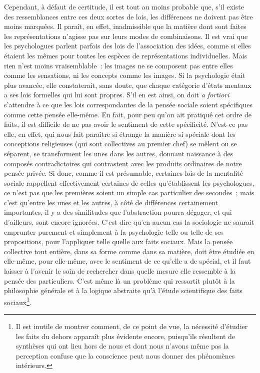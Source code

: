 \documentclass[french,twoside]{book} %
\begin{document}
Cependant, à défaut de certitude, il est tout au moins probable que, s’il existe des ressemblances entre ces deux sortes de lois, les différences ne doivent pas être moins marquées. Il paraît, en effet, inadmissible que la matière dont sont faites les représentations n’agisse pas sur leurs modes de combinaisons. Il est vrai que les psychologues parlent parfois des lois de l’association des idées, comme si elles étaient les mêmes pour toutes les espèces de représentations individuelles. Mais rien n’est moins vraisemblable : les images ne se composent pas entre elles comme les sensations, ni les concepts comme les images. Si la psychologie était plus avancée, elle constaterait, sans doute, que chaque catégorie d’états mentaux a ses lois formelles qui lui sont propres. S’il en est ainsi, on doit {\itshape a fortiori} s’attendre à ce que les lois correspondantes de la pensée sociale soient spécifiques comme cette pensée elle-même. En fait, pour peu qu’on ait pratiqué cet ordre de faits, il est difficile de ne pas avoir le sentiment de cette spécificité. N’est-ce pas elle, en effet, qui nous fait paraître si étrange la manière si spéciale dont les conceptions religieuses (qui sont collectives au premier chef) se mêlent ou se séparent, se transforment les unes dans les autres, donnant naissance à des composés contradictoires qui contrastent avec les produits ordinaires de notre pensée privée. Si donc, comme il est présumable, certaines lois de la mentalité sociale rappellent effectivement certaines de celles qu’établissent les psychologues, ce n’est pas que les premières soient un simple cas particulier des secondes ; mais c’est qu’entre les unes et les autres, à côté de différences certainement importantes, il y a des similitudes que l’abstraction pourra dégager, et qui d’ailleurs, sont encore ignorées. C’est dire qu’en aucun cas la sociologie ne saurait emprunter purement et simplement à la psychologie telle ou telle de ses propositions, pour l’appliquer telle quelle aux faits sociaux. Mais la pensée collective tout entière, dans sa forme comme dans sa matière, doit être étudiée en elle-même, pour elle-même, avec le sentiment de ce qu’elle a de spécial, et il faut laisser à l’avenir le soin de rechercher dans quelle mesure elle ressemble à la pensée des particuliers. C’est même là un problème qui ressortit plutôt à la philosophie générale et à la logique abstraite qu’à l’étude scientifique des faits sociaux\footnote{ Il est inutile de montrer comment, de ce point de vue, la nécessité d’étudier les faits du dehors apparaît plus évidente encore, puisqu’ils résultent de synthèses qui ont lieu hors de nous et dont nous n’avons même pas la perception confuse que la conscience peut nous donner des phénomènes intérieurs.}.
\end{document}
